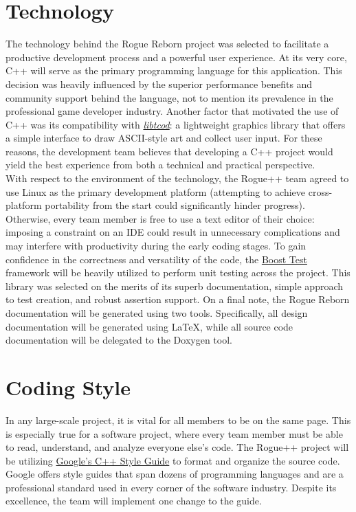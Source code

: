 \documentclass{article}
\begin{document}
\section{Technology}
\label{tech_label}

\indent
The technology behind the Rogue Reborn project was selected to facilitate a productive development process and a powerful user experience. At its very core, C++ will serve as the primary programming language for this application.  This decision was heavily influenced by the superior performance benefits and community support behind the language, not to mention its prevalence in the professional game developer industry.  Another factor that motivated the use of C++ was its compatibility with \href{http://roguecentral.org/doryen/libtcod/}{\textit{libtcod}}: a lightweight graphics library that offers a simple interface to draw ASCII-style art and collect user input.  For these reasons, the development team believes that developing a C++ project would yield the best experience from both a technical and practical perspective.\\

With respect to the environment of the technology, the Rogue++ team agreed to use Linux as the primary development platform (attempting to achieve cross-platform portability from the start could significantly hinder progress).  Otherwise, every team member is free to use a text editor of their choice: imposing a constraint on an IDE could result in unnecessary complications and may interfere with productivity during the early coding stages.  To gain confidence in the correctness and versatility of the code, the \href{http://www.boost.org/doc/libs/1_54_0/libs/test/doc/html/index.html}{Boost Test} framework will be heavily utilized to perform unit testing across the project.  This library was selected on the merits of its superb documentation, simple approach to test creation, and robust assertion support.  On a final note, the Rogue Reborn documentation will be generated using two tools.  Specifically, all design documentation will be generated using LaTeX, while all source code documentation will be delegated to the Doxygen tool.

\section{Coding Style}
\label{style_label}
\indent
In any large-scale project, it is vital for all members to be on the same page.  This is especially true for a software project, where every team member must be able to read, understand, and analyze everyone else's code.  The Rogue++ project will be utilizing \href{https://google.github.io/styleguide/cppguide.html}{Google's C++ Style Guide} to format and organize the source code.  Google offers style guides that span dozens of programming languages and are a professional standard used in every corner of the software industry. Despite its excellence, the team will implement one change to the guide.\\
\end{document}
